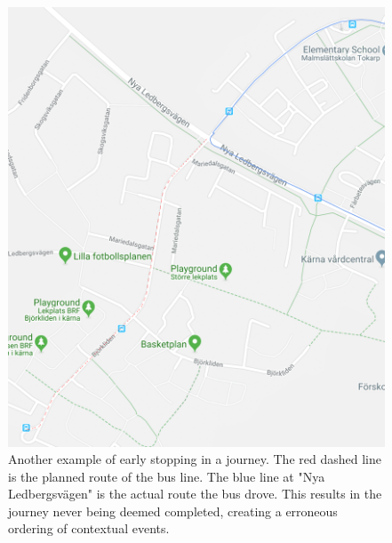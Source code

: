\begin{figure}[ht!]
    \centering
    \includegraphics[width=\textwidth]{figures/lazy_driver_2}
    \caption{Another example of early stopping in a journey.
    The red dashed line is the planned route of the bus line.
    The blue line at "Nya Ledbergsvägen" is the actual route the bus drove.
    This results in the journey never being deemed completed, creating a erroneous ordering of contextual events.}
    \label{fig:human-error-early-stopping-2}
\end{figure}



